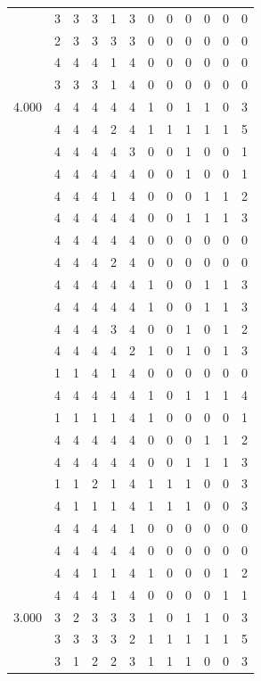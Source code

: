 \documentclass[]{msu-thesis}
\theoremstyle{definition}
\theoremstyle{definition}
\theoremstyle{definition}
\theoremstyle{remark}
\begin{document}
\begin{table}
{\begin{tabular}[t]{rrrrrrrrrrrr}
 & 3 & 3 & 3 & 1 & 3 & 0 & 0 & 0 & 0 & 0 & 0\\
 & 2 & 3 & 3 & 3 & 3 & 0 & 0 & 0 & 0 & 0 & 0\\
 & 4 & 4 & 4 & 1 & 4 & 0 & 0 & 0 & 0 & 0 & 0\\
 & 3 & 3 & 3 & 1 & 4 & 0 & 0 & 0 & 0 & 0 & 0\\
4.000 & 4 & 4 & 4 & 4 & 4 & 1 & 0 & 1 & 1 & 0 & 3\\
 & 4 & 4 & 4 & 2 & 4 & 1 & 1 & 1 & 1 & 1 & 5\\
 & 4 & 4 & 4 & 4 & 3 & 0 & 0 & 1 & 0 & 0 & 1\\
 & 4 & 4 & 4 & 4 & 4 & 0 & 0 & 1 & 0 & 0 & 1\\
 & 4 & 4 & 4 & 1 & 4 & 0 & 0 & 0 & 1 & 1 & 2\\
 & 4 & 4 & 4 & 4 & 4 & 0 & 0 & 1 & 1 & 1 & 3\\
 & 4 & 4 & 4 & 4 & 4 & 0 & 0 & 0 & 0 & 0 & 0\\
 & 4 & 4 & 4 & 2 & 4 & 0 & 0 & 0 & 0 & 0 & 0\\
 & 4 & 4 & 4 & 4 & 4 & 1 & 0 & 0 & 1 & 1 & 3\\
 & 4 & 4 & 4 & 4 & 4 & 1 & 0 & 0 & 1 & 1 & 3\\
 & 4 & 4 & 4 & 3 & 4 & 0 & 0 & 1 & 0 & 1 & 2\\
 & 4 & 4 & 4 & 4 & 2 & 1 & 0 & 1 & 0 & 1 & 3\\
 & 1 & 1 & 4 & 1 & 4 & 0 & 0 & 0 & 0 & 0 & 0\\
 & 4 & 4 & 4 & 4 & 4 & 1 & 0 & 1 & 1 & 1 & 4\\
 & 1 & 1 & 1 & 1 & 4 & 1 & 0 & 0 & 0 & 0 & 1\\
 & 4 & 4 & 4 & 4 & 4 & 0 & 0 & 0 & 1 & 1 & 2\\
 & 4 & 4 & 4 & 4 & 4 & 0 & 0 & 1 & 1 & 1 & 3\\
 & 1 & 1 & 2 & 1 & 4 & 1 & 1 & 1 & 0 & 0 & 3\\
 & 4 & 1 & 1 & 1 & 4 & 1 & 1 & 1 & 0 & 0 & 3\\
 & 4 & 4 & 4 & 4 & 1 & 0 & 0 & 0 & 0 & 0 & 0\\
 & 4 & 4 & 4 & 4 & 4 & 0 & 0 & 0 & 0 & 0 & 0\\
 & 4 & 4 & 1 & 1 & 4 & 1 & 0 & 0 & 0 & 1 & 2\\
 & 4 & 4 & 4 & 1 & 4 & 0 & 0 & 0 & 0 & 1 & 1\\
3.000 & 3 & 2 & 3 & 3 & 3 & 1 & 0 & 1 & 1 & 0 & 3\\
 & 3 & 3 & 3 & 3 & 2 & 1 & 1 & 1 & 1 & 1 & 5\\
 & 3 & 1 & 2 & 2 & 3 & 1 & 1 & 1 & 0 & 0 & 3\\

\end{tabular}}
\end{table}
\end{document}
